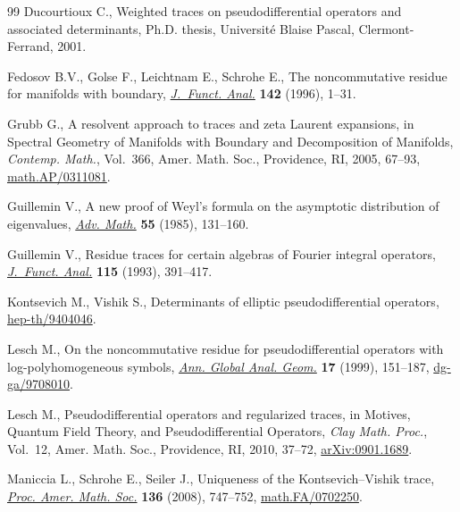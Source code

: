 \documentclass[11pt]{article}
\begin{document}
\begin{thebibliography}{99}
Ducourtioux C., Weighted traces on pseudodif\/ferential operators and associated
  determinants, Ph.D. thesis, Universit\'e Blaise Pascal, Clermont-Ferrand,
  2001.

Fedosov B.V., Golse F., Leichtnam E., Schrohe E., The noncommutative residue
  for manifolds with boundary, \href{http://dx.doi.org/10.1006/jfan.1996.0142}{\textit{J.~Funct. Anal.}} \textbf{142} (1996),
  1--31.

Grubb G., A resolvent approach to traces and zeta {L}aurent expansions, in
  Spectral Geometry of Manifolds with Boundary and Decomposition of Manifolds,
  \textit{Contemp. Math.}, Vol.~366, Amer. Math. Soc., Providence, RI, 2005,
  67--93, \href{http://arxiv.org/abs/math.AP/0311081}{math.AP/0311081}.

Guillemin V., A new proof of {W}eyl's formula on the asymptotic distribution of
  eigenvalues, \href{http://dx.doi.org/10.1016/0001-8708(85)90018-0}{\textit{Adv. Math.}} \textbf{55} (1985), 131--160.

Guillemin V., Residue traces for certain algebras of {F}ourier integral
  operators, \href{http://dx.doi.org/10.1006/jfan.1993.1096}{\textit{J.~Funct. Anal.}} \textbf{115} (1993), 391--417.

Kontsevich M., Vishik S., Determinants of elliptic pseudodif\/ferential
  operators, \href{http://arxiv.org/abs/hep-th/9404046}{hep-th/9404046}.

Lesch M., On the noncommutative residue for pseudodif\/ferential operators with
  log-polyhomogeneous symbols, \href{http://dx.doi.org/10.1023/A:1006504318696}{\textit{Ann. Global Anal. Geom.}} \textbf{17}
  (1999), 151--187, \href{http://arxiv.org/abs/dg-ga/9708010}{dg-ga/9708010}.

Lesch M., Pseudodif\/ferential operators and regularized traces, in Motives,
  Quantum Field Theory, and Pseudodif\/ferential Operators, \textit{Clay Math.
  Proc.}, Vol.~12, Amer. Math. Soc., Providence, RI, 2010, 37--72,
  \href{http://arxiv.org/abs/0901.1689}{arXiv:0901.1689}.

Maniccia L., Schrohe E., Seiler J., Uniqueness of the {K}ontsevich--{V}ishik
  trace, \href{http://dx.doi.org/10.1090/S0002-9939-07-09168-X}{\textit{Proc. Amer. Math. Soc.}} \textbf{136} (2008), 747--752,
  \href{http://arxiv.org/abs/math.FA/0702250}{math.FA/0702250}.


\end{thebibliography}
\end{document}
